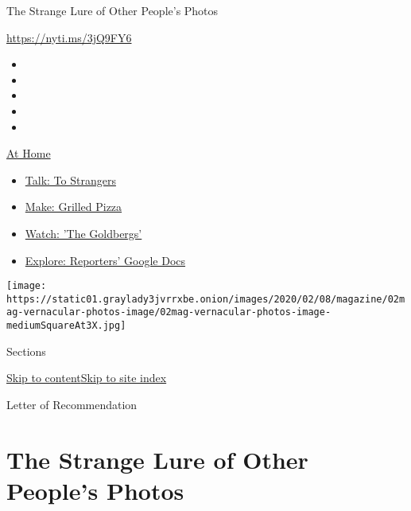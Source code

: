 The Strange Lure of Other People's Photos

\url{https://nyti.ms/3jQ9FY6}

\begin{itemize}
\item
\item
\item
\item
\item
\end{itemize}

\href{https://www.nytimes3xbfgragh.onion/spotlight/at-home?action=click\&pgtype=Article\&state=default\&region=TOP_BANNER\&context=at_home_menu}{At
Home}

\begin{itemize}
\tightlist
\item
  \href{https://www.nytimes3xbfgragh.onion/2020/08/03/well/family/the-benefits-of-talking-to-strangers.html?action=click\&pgtype=Article\&state=default\&region=TOP_BANNER\&context=at_home_menu}{Talk:
  To Strangers}
\item
  \href{https://www.nytimes3xbfgragh.onion/2020/08/01/at-home/coronavirus-make-pizza-on-a-grill.html?action=click\&pgtype=Article\&state=default\&region=TOP_BANNER\&context=at_home_menu}{Make:
  Grilled Pizza}
\item
  \href{https://www.nytimes3xbfgragh.onion/2020/07/31/arts/television/goldbergs-abc-stream.html?action=click\&pgtype=Article\&state=default\&region=TOP_BANNER\&context=at_home_menu}{Watch:
  'The Goldbergs'}
\item
  \href{https://www.nytimes3xbfgragh.onion/interactive/2020/at-home/even-more-reporters-editors-diaries-lists-recommendations.html?action=click\&pgtype=Article\&state=default\&region=TOP_BANNER\&context=at_home_menu}{Explore:
  Reporters' Google Docs}
\end{itemize}

\texttt{[image: https://static01.graylady3jvrrxbe.onion/images/2020/02/08/magazine/02mag-vernacular-photos-image/02mag-vernacular-photos-image-mediumSquareAt3X.jpg]}

Sections

\protect\hyperlink{site-content}{Skip to
content}\protect\hyperlink{site-index}{Skip to site index}

Letter of Recommendation

\hypertarget{the-strange-lure-of-other-peoples-photos}{%
\section{The Strange Lure of Other People's
Photos}\label{the-strange-lure-of-other-peoples-photos}}

